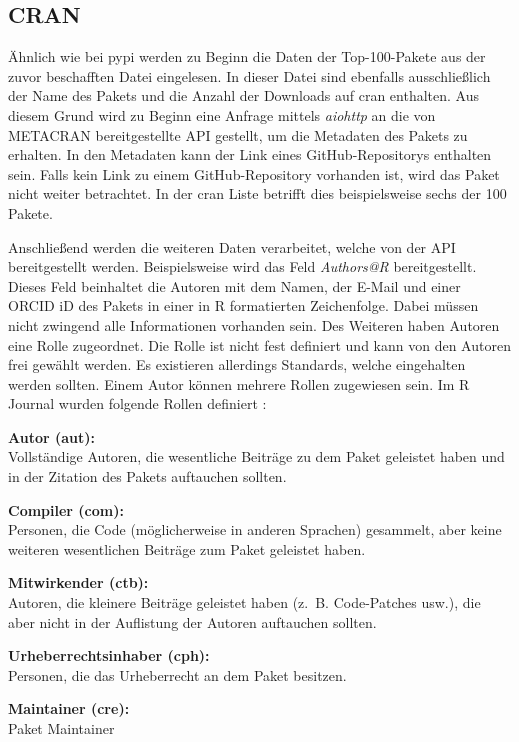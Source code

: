 \subsection{CRAN}
\label{subsec:datenbeschaffung_cran}
Ähnlich wie bei \gls{pypi} werden zu Beginn die Daten der Top-100-Pakete aus der zuvor beschafften Datei eingelesen.
In dieser Datei sind ebenfalls ausschließlich der Name des Pakets und die Anzahl der Downloads auf \gls{cran} enthalten.
Aus diesem Grund wird zu Beginn eine Anfrage mittels \emph{aiohttp} an die von METACRAN bereitgestellte API gestellt, um die Metadaten des Pakets zu erhalten.
In den Metadaten kann der Link eines GitHub-Repositorys enthalten sein.
Falls kein Link zu einem GitHub-Repository vorhanden ist, wird das Paket nicht weiter betrachtet.
In der \gls{cran} Liste betrifft dies beispielsweise sechs der 100 Pakete.

Anschließend werden die weiteren Daten verarbeitet, welche von der API bereitgestellt werden.
Beispielsweise wird das Feld \emph{Authors@R} bereitgestellt.
Dieses Feld beinhaltet die Autoren mit dem Namen, der E-Mail und einer ORCID iD des Pakets in einer in R formatierten Zeichenfolge.
Dabei müssen nicht zwingend alle Informationen vorhanden sein.
Des Weiteren haben Autoren eine Rolle zugeordnet.
Die Rolle ist nicht fest definiert und kann von den Autoren frei gewählt werden.
Es existieren allerdings Standards, welche eingehalten werden sollten.
Einem Autor können mehrere Rollen zugewiesen sein.
Im R Journal wurden folgende Rollen definiert \autocite{hornik_who_2011}:

\textbf{Autor (aut):}\\
Vollständige Autoren, die wesentliche Beiträge zu dem Paket geleistet haben und in der Zitation des Pakets auftauchen sollten.

\textbf{Compiler (com):}\\
Personen, die Code (möglicherweise in anderen Sprachen) gesammelt, aber keine weiteren wesentlichen Beiträge zum Paket geleistet haben.

\textbf{Mitwirkender (ctb):}\\
Autoren, die kleinere Beiträge geleistet haben (z.~B. Code-Patches usw.), die aber nicht in der Auflistung der Autoren auftauchen sollten.

\textbf{Urheberrechtsinhaber (cph):}\\
Personen, die das Urheberrecht an dem Paket besitzen.

\textbf{Maintainer (cre):}\\
Paket Maintainer


